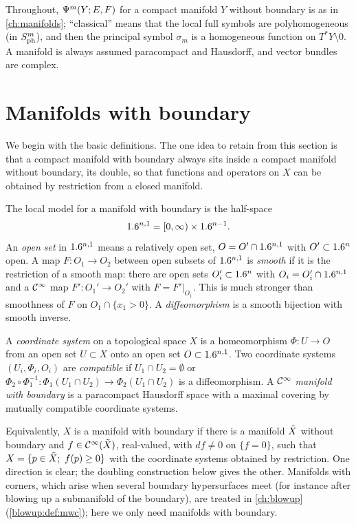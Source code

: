 Throughout, $\Psi^{m}(Y;E,F)$ for a compact manifold $Y$ without boundary is as in
\cref{ch:manifolds}; ``classical'' means that the local full symbols are
polyhomogeneous (in $S^{m}_{\mathrm{ph}}$), and then the principal symbol $\sigma_m$ is a
homogeneous function on $T^*Y\setminus0$. A manifold is always assumed paracompact and
Hausdorff, and vector bundles are complex.

\section{Manifolds with boundary}\label{boundary:sec:manifolds}

We begin with the basic definitions. The one idea to retain from this section is
that a compact manifold with boundary always sits inside a compact manifold without
boundary, its double, so that functions and operators on $X$ can be obtained by
restriction from a closed manifold.

The local model for a manifold with boundary is the half-space
\begin{equation*}
1.6^{n,1}=[0,\infty)\times1.6^{n-1}.
\end{equation*}
An \emph{open set} in $1.6^{n,1}$ means a relatively open set, $O=O'\cap1.6^{n,1}$ with
$O'\subset1.6^n$ open. A map $F:O_1\to O_2$ between open subsets of $1.6^{n,1}$ is
\emph{smooth} if it is the restriction of a smooth map: there are open sets
$O_i'\subset1.6^n$ with $O_i=O_i'\cap1.6^{n,1}$ and a $\mathcal{C}^\infty$ map $F':O_1'\to O_2'$ with
$F=F'|_{O_1}$. This is much stronger than smoothness of $F$ on $O_1\cap\{x_1>0\}$. A
\emph{diffeomorphism} is a smooth bijection with smooth inverse.

\begin{definition}
A \emph{coordinate system} on a topological space $X$ is a homeomorphism
$\Phi:U\to O$ from an open set $U\subset X$ onto an open set $O\subset1.6^{n,1}$. Two
coordinate systems $(U_i,\Phi_i,O_i)$ are \emph{compatible} if $U_1\cap U_2=\emptyset$
or $\Phi_2\circ\Phi_1^{-1}:\Phi_1(U_1\cap U_2)\to\Phi_2(U_1\cap U_2)$ is a
diffeomorphism. A \emph{$\mathcal{C}^\infty$ manifold with boundary} is a paracompact Hausdorff space
with a maximal covering by mutually compatible coordinate systems.
\end{definition}

Equivalently, $X$ is a manifold with boundary if there is a manifold $\tilde{X}$ without
boundary and $f\in\mathcal{C}^\infty(\tilde{X})$, real-valued, with $df\ne0$ on $\{f=0\}$, such that
$X=\{p\in\tilde{X};\ f(p)\ge0\}$ with the coordinate systems obtained by restriction. One
direction is clear; the doubling construction below gives the other.
Manifolds with corners, which arise when several boundary hypersurfaces meet (for
instance after blowing up a submanifold of the boundary), are treated in
\cref{ch:blowup} (\cref{blowup:def:mwc}); here we only need manifolds with boundary.

